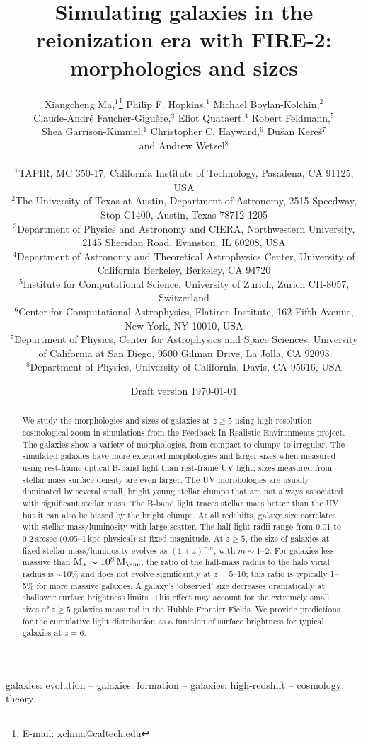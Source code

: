 \documentclass[useAMS,usenatbib]{mn2e}
\title[High-$z$ galaxy morphologies and sizes in FIRE-2]
{Simulating galaxies in the reionization era with FIRE-2: morphologies and sizes}
\author[X. Ma et al.]{
  \parbox[t]{1.0\textwidth}{
   Xiangcheng Ma,$^1$\thanks{E-mail: xchma@caltech.edu}
   Philip F. Hopkins,$^1$ 
   Michael Boylan-Kolchin,$^2$ \\
   Claude-Andr{\'e} Faucher-Gigu{\`e}re,$^3$ 
   Eliot Quataert,$^4$
   Robert Feldmann,$^5$ \\
   Shea Garrison-Kimmel,$^1$
   Christopher C. Hayward,$^6$
   Du{\v s}an Kere{\v s}$^7$ \\ and
   Andrew Wetzel$^8$
  }
  \vspace{5pt} \\
  $^1$TAPIR, MC 350-17, California Institute of Technology, Pasadena, CA 91125, USA \\
  $^2$The University of Texas at Austin, Department of Astronomy, 2515 Speedway, Stop C1400, Austin, Texas 78712-1205 \\
  $^3$Department of Physics and Astronomy and CIERA, Northwestern University, 2145 Sheridan Road, Evanston, IL 60208, USA \\
  $^4$Department of Astronomy and Theoretical Astrophysics Center, University of California Berkeley, Berkeley, CA 94720 \\
  $^5$Institute for Computational Science, University of Zurich, Zurich CH-8057, Switzerland \\
  $^6$Center for Computational Astrophysics, Flatiron Institute, 162 Fifth Avenue, New York, NY 10010, USA \\
  $^7$Department of Physics, Center for Astrophysics and Space Sciences, University of California at San Diego, 9500 Gilman Drive, La Jolla, CA 92093 \\
  $^8$Department of Physics, University of California, Davis, CA 95616, USA \\
}
\date{Draft version \today}
\newcommand{\Ms}{{\rm M}_{\ast}}
\newcommand{\Msun}{{\rm M}_{\sun}}
\begin{document}
\maketitle
\label{firstpage}

\begin{abstract}
We study the morphologies and sizes of galaxies at $z\geq5$ using high-resolution cosmological zoom-in simulations from the Feedback In Realistic Environments project. The galaxies show a variety of morphologies, from compact to clumpy to irregular. The simulated galaxies have more extended morphologies and larger sizes when measured using rest-frame optical B-band light than rest-frame UV light; sizes measured from stellar mass surface density are even larger. The UV morphologies are usually dominated by several small, bright young stellar clumps that are not always associated with significant stellar mass. The B-band light traces stellar mass better than the UV, but it can also be biased by the bright clumps. At all redshifts, galaxy size correlates with stellar mass/luminosity with large scatter. The half-light radii range from 0.01 to 0.2\,arcsec (0.05--1\,kpc physical) at fixed magnitude. At $z\geq5$, the size of galaxies at fixed stellar mass/luminosity evolves as $(1+z)^{-m}$, with $m\sim1$--2. For galaxies less massive than $\Ms\sim10^8\,\Msun$, the ratio of the half-mass radius to the halo virial radius is $\sim10\%$ and does not evolve significantly at $z=5$--10; this ratio is typically 1--5\% for more massive galaxies. A galaxy's `observed' size decreases dramatically at shallower surface brightness limits. This effect may account for the extremely small sizes of $z\geq5$ galaxies measured in the Hubble Frontier Fields. We provide predictions for the cumulative light distribution as a function of surface brightness for typical galaxies at $z=6$. %
\end{abstract}

\begin{keywords}
galaxies: evolution -- galaxies: formation -- galaxies: high-redshift -- cosmology: theory 
\end{keywords}
\end{document}
